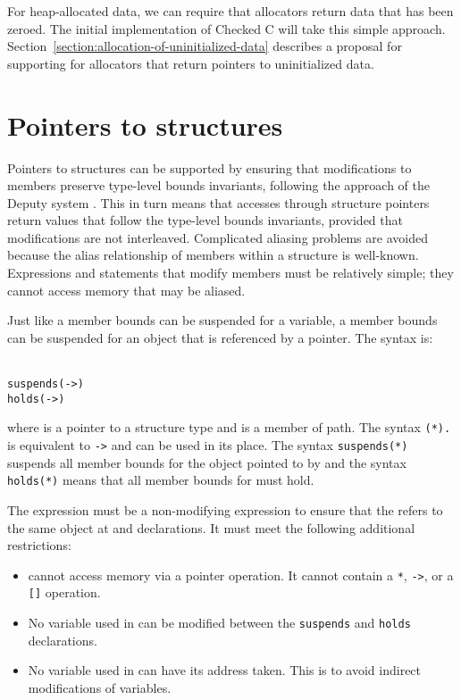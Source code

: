 For heap-allocated data, we can require that allocators
return data that has been zeroed.  The initial implementation of
Checked C will take this simple approach.  Section~\ref{section:allocation-of-uninitialized-data} 
describes a proposal for supporting for allocators that return pointers to
uninitialized data.
 
\section{Pointers to structures}

Pointers to  structures can be supported by ensuring that modifications to members
preserve type-level bounds invariants, following the approach of the Deputy
system \cite{Condit2007}.  This in turn means that accesses through structure
pointers return values that  follow the type-level bounds invariants, provided that modifications
are not interleaved.  Complicated aliasing problems are avoided because the
alias relationship of members within a structure is well-known.  Expressions
and statements that modify members must be relatively simple; they cannot access memory
that may be aliased.

Just like a member bounds can be suspended for a variable, a member bounds can 
be suspended for an object that is referenced by a pointer. The syntax is:

\begin{tabbing}
\= \\
\>\texttt{suspends(->)} \\
\>\texttt{holds(->)} \\
\end{tabbing}

where  is a pointer to a structure type  and  is a member of
path.  The syntax \texttt{(*).} is equivalent to 
\texttt{->} and can be used in its place.  
The syntax \texttt{suspends(*)} suspends all member bounds for 
the object pointed to by  and the syntax \texttt{holds(*)} 
means that all member bounds for  must hold.

The expression  must be a non-modifying expression to ensure that the 
refers to the same object at  and  declarations.
It must meet the following additional restrictions:
\begin{itemize}
\item {} cannot access memory via a pointer operation.
      It cannot contain a \texttt{*}, \texttt{->},  or a \texttt{[]} operation.
\item No variable used in  can be modified between the \texttt{suspends}
and \texttt{holds} declarations.
\item No variable used in  can have its address taken.  This is to avoid
indirect modifications of variables.
\end{itemize}

